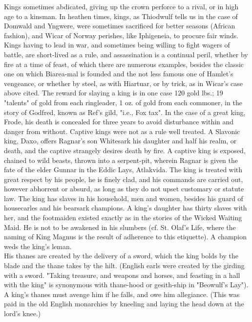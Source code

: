 \documentclass[10pt,a4paper]{report}
\begin{document}
Kings sometimes abdicated, giving up the crown perforce to a rival, or in high age to a kinsman. In heathen times, kings, as Thiodwulf tells us in the case of Domwald and Yngwere, were sometimes sacrificed for better seasons (African fashion), and Wicar of Norway perishes, like Iphigeneia, to procure fair winds. Kings having to lead in war, and sometimes being willing to fight wagers of battle, are short-lived as a rule, and assassination is a continual peril, whether by fire at a time of feast, of which there are numerous examples, besides the classic one on which Biarea-mal is founded and the not less famous one of Hamlet's vengeance, or whether by steel, as with Hiartuar, or by trick, as in Wicar's case above cited. The reward for slaying a king is in one case 120 gold lbs.; 19 "talents" of gold from each ringleader, 1 oz. of gold from each commoner, in the story of Godfred, known as Ref's gild, "i.e., Fox tax". In the case of a great king, Frode, his death is concealed for three years to avoid disturbance within and danger from without. Captive kings were not as a rule well treated. A Slavonic king, Daxo, offers Ragnar's son Whitesark his daughter and half his realm, or death, and the captive strangely desires death by fire. A captive king is exposed, chained to wild beasts, thrown into a serpent-pit, wherein Ragnar is given the fate of the elder Gunnar in the Eddic Lays, Atlakvida. The king is treated with great respect by his people, he is finely clad, and his commands are carried out, however abhorrent or absurd, as long as they do not upset customary or statute law. The king has slaves in his household, men and women, besides his guard of housecarles and his bearsark champions. A king's daughter has thirty slaves with her, and the footmaiden existed exactly as in the stories of the Wicked Waiting Maid. He is not to be awakened in his slumbers (cf. St. Olaf's Life, where the naming of King Magnus is the result of adherence to this etiquette). A champion weds the king's leman.\\

His thanes are created by the delivery of a sword, which the king bolds by the blade and the thane takes by the hilt. (English earls were created by the girding with a sword. "Taking treasure, and weapons and horses, and feasting in a hall with the king" is synonymous with thane-hood or gesith-ship in "Beowulf's Lay"). A king's thanes must avenge him if he falls, and owe him allegiance. (This was paid in the old English monarchies by kneeling and laying the head down at the lord's knee.)\\
\end{document}
